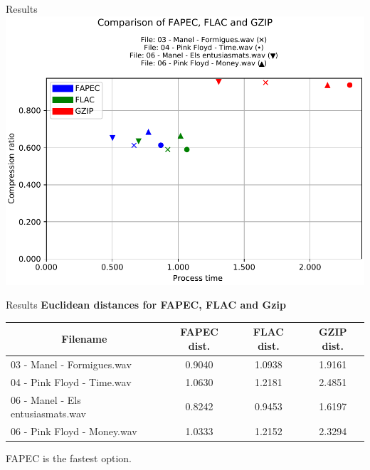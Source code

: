 \documentclass[usenames,dvipsnames]{beamer}
\begin{document}
\begin{frame}{Results}
\centering
\includegraphics[scale=0.62]{graphics/2021-05-30T22:30:32.186296-results_wave.csv_comparison.pdf}
\end{frame}

\begin{frame}{Results}
\textbf{Euclidean distances for FAPEC, FLAC and Gzip}
\vspace{1em}

\footnotesize
\begin{tabular}{|
		>{}l |
		>{}c |
		>{}c |c|}
	\hline
	\multicolumn{1}{|c|}{\cellcolor[HTML]{d6cefc}Filename} & \cellcolor[HTML]{d6cefc}FAPEC dist. & \cellcolor[HTML]{d6cefc}FLAC dist. & \cellcolor[HTML]{d6cefc}GZIP dist. \\ \hline
	03 - Manel - Formigues.wav                             & 0.9040                                 & 1.0938                                & 1.9161                                \\ \hline
	04 - Pink Floyd - Time.wav                             & 1.0630                                 & 1.2181                                & 2.4851                                \\ \hline
	06 - Manel - Els entusiasmats.wav                      & 0.8242                                 & 0.9453                                & 1.6197                                \\ \hline
	06 - Pink Floyd - Money.wav                            & 1.0333                                 & 1.2152                                & 2.3294                                \\ \hline
\end{tabular}
\normalsize
\vspace{1.5em}

FAPEC is the fastest option.
\end{frame}
\end{document}
